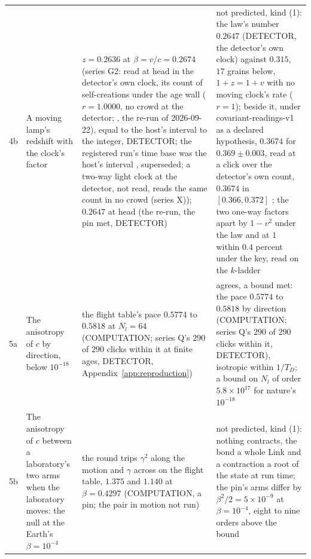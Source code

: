 {\begin{longtable}{L{0.3in}L{2.0in}L{1.5in}L{2.2in}}
4b & A moving lamp's redshift with the clock's factor \cite{botermann2014} & $z = 0.2636$ at $\beta = v/c = 0.2674$ (series G2: read at head in the detector's own clock, its count of self-creations under the age wall ($r = 1.0000$, no crowd at the detector; \cite{criteria}, the re-run of 2026-09-22), equal to the host's interval to the integer, DETECTOR; the registered run's time base was the host's interval \cite[record 768]{log}, superseded; a two-way light clock at the detector, not read, reads the same count in no crowd (series X)); $0.2647$ at head (the re-run, the pin met, DETECTOR) & not predicted, kind (1): the law's number $0.2647$ (DETECTOR, the detector's own clock) against $0.315$, $17$ grains below, $1 + z = 1 + v$ with no moving clock's rate ($r = 1$); beside it, under covariant-readings-v1 as a declared hypothesis, $0.3674$ for $0.369 \pm 0.003$, read at a click over the detector's own count, $0.3674$ in $[0.366, 0.372]$ \cite{run4ab}; the two one-way factors apart by $1 - v^2$ under the law and at $1$ within $0.4$ percent under the key, read on the $k$-ladder \cite{run4ab} \\
5a & The anisotropy of $c$ by direction, below $10^{-18}$ \cite{nagel2015} & the flight table's pace $0.5774$ to $0.5818$ at $N_l = 64$ (COMPUTATION; series Q's $290$ of $290$ clicks within it at finite ages, DETECTOR, Appendix~\ref{app:reproduction}) & agrees, a bound met: the pace $0.5774$ to $0.5818$ by direction (COMPUTATION; series Q's $290$ of $290$ clicks within it, DETECTOR), isotropic within $1/T_D$; a bound on $N_l$ of order $5.8 \times 10^{17}$ for nature's $10^{-18}$ \\
5b & The anisotropy of $c$ between a laboratory's two arms when the laboratory moves: the null at the Earth's $\beta = 10^{-4}$ \cite{michelson1887} & the round trips $\gamma^2$ along the motion and $\gamma$ across on the flight table, $1.375$ and $1.140$ at $\beta = 0.4297$ (COMPUTATION, a pin; the pair in motion not run) & not predicted, kind (1): nothing contracts, the bond a whole Link and a contraction a root of the state at run time; the pin's arms differ by $\beta^2/2 = 5 \times 10^{-9}$ at $\beta = 10^{-4}$, eight to nine orders above the bound \\

\end{longtable}}
